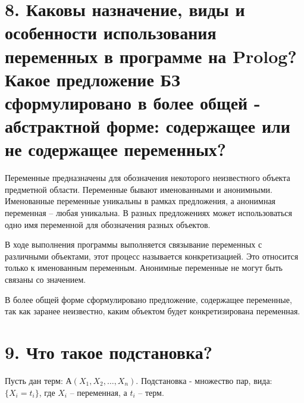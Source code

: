 \documentclass[12pt]{report}
\begin{document}
\section*{8. Каковы назначение, виды и особенности использования переменных в программе на Prolog? Какое предложение БЗ сформулировано в более общей - абстрактной форме: содержащее или не содержащее переменных?}

Переменные предназначены для обозначения некоторого неизвестного объекта предметной области. Переменные бывают именованными и анонимными. Именованные переменные уникальны в рамках предложения, а анонимная переменная – любая уникальна. В разных предложениях может использоваться одно имя переменной для обозначения разных объектов.

В ходе выполнения программы выполняется связывание переменных с различными объектами, этот процесс называется конкретизацией. Это относится только к именованным переменным. Анонимные переменные не могут быть связаны со значением.

В более общей форме сформулировано предложение, содержащее переменные, так как заранее неизвестно, каким объектом будет конкретизирована переменная.

\section*{9. Что такое подстановка?}

Пусть дан терм: $А(X_1, X_2,  \dots ,X_n)$.
Подстановка - множество пар, вида: $\{X _ i = t _ i\}$, где $X_i$ –   переменная, а $t_i$ –  терм.

	
\end{document}

